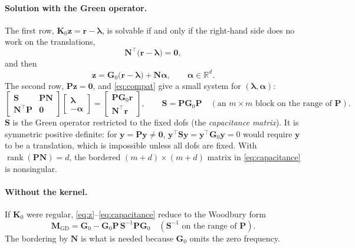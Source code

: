 \documentclass[11pt,a4paper]{article}
\begin{document}
\paragraph{Solution with the Green operator.} The first row, $\mathbf{K}_0\mathbf{z} = \mathbf{r} - \boldsymbol{\lambda}$, is
solvable if and only if the right-hand side does no work on the translations,
\begin{equation}
  \mathbf{N}^{\top}\bigl(\mathbf{r} - \boldsymbol{\lambda}\bigr) = \mathbf{0},
  \label{eq:compat}
\end{equation}
and then
\begin{equation}
  \mathbf{z} = \mathbf{G}_0\bigl(\mathbf{r} - \boldsymbol{\lambda}\bigr) + \mathbf{N}\boldsymbol{\alpha},
  \qquad \boldsymbol{\alpha} \in \mathbb{R}^{d}.
  \label{eq:z}
\end{equation}
The second row, $\mathbf{P}\mathbf{z} = \mathbf{0}$, and \eqref{eq:compat} give a small system for
$(\boldsymbol{\lambda}, \boldsymbol{\alpha})$:
\begin{equation}
  \begin{bmatrix} \mathbf{S} & \mathbf{P}\mathbf{N} \\ \mathbf{N}^{\top}\mathbf{P} & \mathbf{0} \end{bmatrix}
  \begin{bmatrix} \boldsymbol{\lambda} \\ -\boldsymbol{\alpha} \end{bmatrix}
  =
  \begin{bmatrix} \mathbf{P}\mathbf{G}_0\mathbf{r} \\ \mathbf{N}^{\top}\mathbf{r} \end{bmatrix},
  \qquad
  \mathbf{S} = \mathbf{P}\mathbf{G}_0\mathbf{P} \quad (\text{an } m\times m \text{ block on the range of } \mathbf{P}).
  \label{eq:capacitance}
\end{equation}
$\mathbf{S}$ is the Green operator restricted to the fixed dofs (the \emph{capacitance matrix}). It is symmetric
positive definite: for $\mathbf{y} = \mathbf{P}\mathbf{y} \neq \mathbf{0}$, $\mathbf{y}^{\top}\mathbf{S}\mathbf{y} =
\mathbf{y}^{\top}\mathbf{G}_0\mathbf{y} = 0$ would require $\mathbf{y}$ to be a translation, which is impossible unless all dofs are fixed. With
$\operatorname{rank}(\mathbf{P}\mathbf{N}) = d$, the bordered $(m+d)\times(m+d)$ matrix in \eqref{eq:capacitance} is
nonsingular.

\paragraph{Without the kernel.} If $\mathbf{K}_0$ were regular, \eqref{eq:z}--\eqref{eq:capacitance} reduce to the
Woodbury form
\[
  \mathbf{M}_{\mathrm{GD}} = \mathbf{G}_0 - \mathbf{G}_0\mathbf{P}\,\mathbf{S}^{-1}\mathbf{P}\mathbf{G}_0 \quad (\mathbf{S}^{-1} \text{ on the range of } \mathbf{P}).
\]
The bordering by $\mathbf{N}$ is what is needed because $\mathbf{G}_0$ omits the zero frequency.
\end{document}
